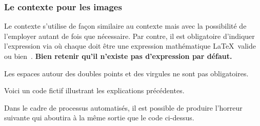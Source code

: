 \documentclass[10pt, a4paper]{article}
\begin{document}

\subsubsection{Le contexte  pour les images}

Le contexte  s'utilise de façon similaire au contexte  mais avec la possibilité de l'employer autant de fois que nécessaire.
Par contre, il est obligatoire d'indiquer l'expression  via 
où chaque  doit être une expression mathématique \LaTeX\ valide ou bien \,.
\textbf{Bien retenir qu'il n'existe pas d'expression par défaut.}




\begin{tdocnote}
    Les espaces autour des doubles points et des virgules ne sont pas obligatoires.
\end{tdocnote}




Voici un code fictif illustrant les explications précédentes.



Dans le cadre de processus automatisés, il est possible de produire l'horreur suivante qui aboutira à la même sortie que le code ci-dessus.

\end{document}
